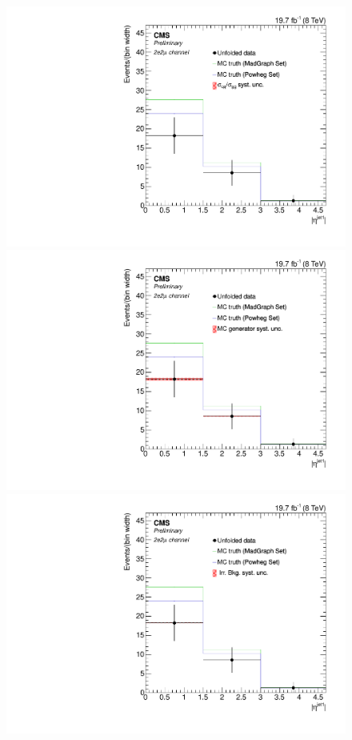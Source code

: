 \begin{figure}[hbtp]
 \begin{center}
   \includegraphics[width=0.8\cmsFigWidth]{Figures/Unfolding/Systematics/ZZTo2e2m_EtaJet1_qqgg_Mad_fr}     
   \includegraphics[width=0.8\cmsFigWidth]{Figures/Unfolding/Systematics/ZZTo2e2m_EtaJet1_MCgen_Mad_fr}     
   \includegraphics[width=0.8\cmsFigWidth]{Figures/Unfolding/Systematics/ZZTo2e2m_EtaJet1_IrrBkg_Mad_fr}

\end{center}
\end{figure}
